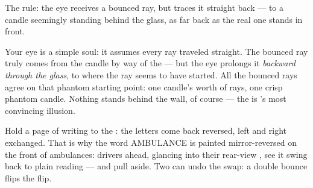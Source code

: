\begin{omfigure}

{\small The  rule: the eye receives a bounced ray, but traces
it straight back --- to a candle seemingly standing behind the
glass, as far back as the real one stands in front.}
\end{omfigure}

\begin{example}\label{ex:g5:mirrors-reflection:why}
Your eye is a simple soul: it assumes every ray traveled straight.
The bounced ray truly comes from the candle by way of the 
--- but the eye prolongs it \emph{backward through the glass}, to
where the ray seems to have started. All the bounced rays agree on
that phantom starting point: one candle's worth of rays, one crisp
phantom candle. Nothing stands behind the wall, of course --- the
 is 's most convincing illusion.
\end{example}

\begin{example}\label{ex:g5:mirrors-reflection:swap}
Hold a page of writing to the : the letters come back
reversed, left and right exchanged. That is why the word
AMBULANCE is painted mirror-reversed on the front of ambulances:
drivers ahead, glancing into their rear-view , see it swing
back to plain reading --- and pull aside. Two  can undo the
swap: a double bounce flips the flip.
\end{example}

